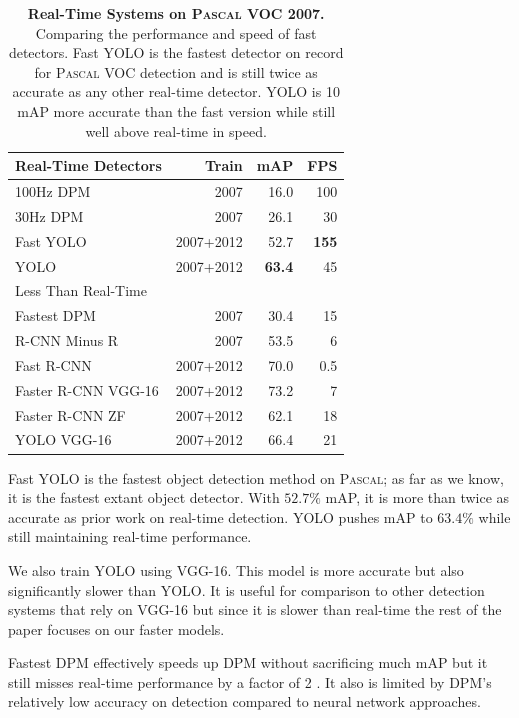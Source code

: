 \documentclass[10pt,twocolumn,letterpaper]{article}
\begin{document}
\begin{table}[h]
\begin{center}
\begin{tabular}{lrrr}
Real-Time Detectors & Train & mAP & FPS\\
\hline
100Hz DPM \cite{sadeghi201430hz}& 2007 & 16.0 & 100\\
30Hz DPM \cite{sadeghi201430hz} & 2007 & 26.1 & 30 \\
Fast YOLO & 2007+2012 & 52.7 & \textbf{155} \\
YOLO & 2007+2012 & \textbf{63.4} & 45 \\
\hline
\hline
Less Than Real-Time &  & \\
\hline
Fastest DPM \cite{yan2014fastest} & 2007 & 30.4 & 15 \\
R-CNN Minus R \cite{lenc2015r} & 2007 & 53.5 & 6 \\
Fast R-CNN \cite{DBLP:journals/corr/Girshick15}& 2007+2012 & 70.0 & 0.5 \\
Faster R-CNN VGG-16\cite{ren2015faster}& 2007+2012 & 73.2 & 7 \\
Faster R-CNN ZF \cite{ren2015faster}& 2007+2012 & 62.1 & 18 \\
YOLO VGG-16 & 2007+2012 & 66.4 & 21 \\
\end{tabular}
\end{center}
\caption{\small \textbf{Real-Time Systems on \textsc{Pascal} VOC 2007.} Comparing the performance and speed of fast detectors. Fast YOLO is the fastest detector on record for \textsc{Pascal} VOC detection and is still twice as accurate as any other real-time detector. YOLO is 10 mAP more accurate than the fast version while still well above real-time in speed.}
\label{timing}
\end{table}

Fast YOLO is the fastest object detection method on \textsc{Pascal}; as far as we know, it is the fastest extant object detector. With $52.7\%$ mAP, it is more than twice as accurate as prior work on real-time detection. YOLO pushes mAP to $63.4\%$ while still maintaining real-time performance.

We also train YOLO using VGG-16. This model is more accurate but also significantly slower than YOLO. It is useful for comparison to other detection systems that rely on VGG-16 but since it is slower than real-time the rest of the paper focuses on our faster models.

Fastest DPM effectively speeds up DPM without sacrificing much mAP but it still misses real-time performance by a factor of 2 \cite{yan2014fastest}. It also is limited by DPM's relatively low accuracy on detection compared to neural network approaches.
\end{document}
